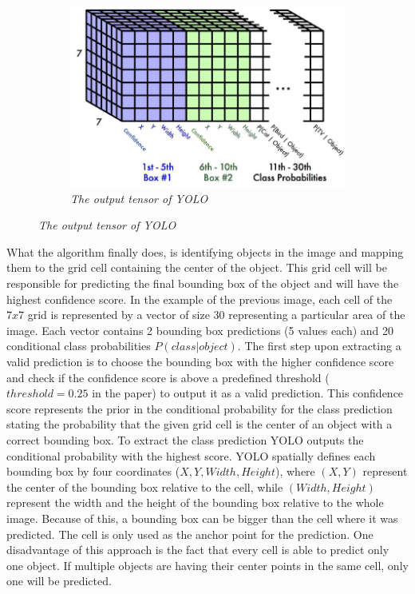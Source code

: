\begin{figure}[H]
    \centering
    \begin{subfigure}[b]{0.6\textwidth}
        \centering
        \includegraphics[width=\textwidth]{Figures/2. Related Work/yolo_2.png}
        \caption{\textit{The output tensor of YOLO} \cite{yolo_images}}
    \end{subfigure}
\end{figure}

What the algorithm finally does, is identifying objects in the image and mapping
them to the grid cell containing the center of the object. This grid cell will
be responsible for predicting the final bounding box of the object and will have
the highest confidence score.
In the example of the previous image, each cell of the $7 x 7$ grid is
represented by a vector of size 30 representing a particular area of the image.
Each vector contains 2 bounding box predictions (5 values each) and 20
conditional class probabilities $P(class|object)$. The first step upon extracting
a valid prediction is to choose the bounding box with the higher confidence
score and check if the confidence score is above a predefined threshold
($threshold = 0.25$ in the paper) to output it as a valid prediction. This
confidence score represents the prior in the conditional probability for the
class prediction stating the probability that the given grid cell is the center
of an object with a correct bounding box. To extract the class prediction YOLO
outputs the conditional probability with the highest score. YOLO spatially
defines each bounding box by four coordinates ($X, Y, Width, Height$), where
$(X, Y)$ represent the center of the bounding box relative to the cell, while
$(Width, Height)$ represent the width and the height of the bounding box
relative to the whole image. Because of this, a bounding box can be bigger than
the cell where it was predicted. The cell is only used as the anchor point for
the prediction. One disadvantage of this approach is the fact that every cell
is able to predict only one object. If multiple objects are having their center
points in the same cell, only one will be predicted.

